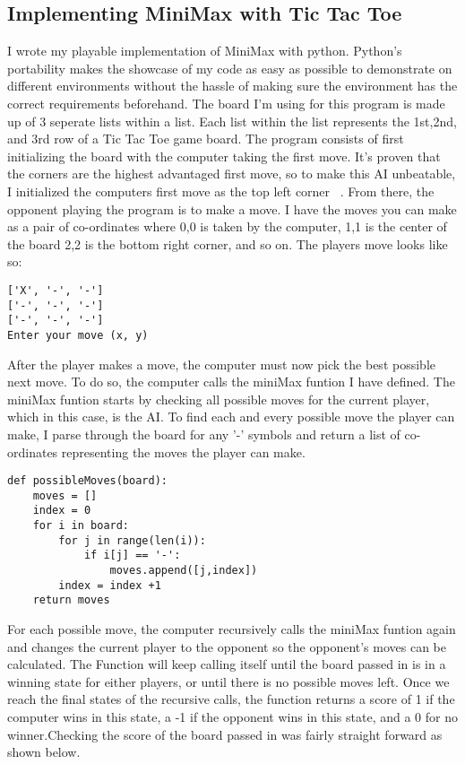 \documentclass[letterpaper]{article}
\begin{document}
\subsection{Implementing MiniMax with Tic Tac Toe}
I wrote my playable implementation of MiniMax with python. Python's portability makes the showcase of my code as easy as possible to demonstrate on different environments without the hassle of making sure the environment has the correct requirements beforehand. The board I'm using for this program is made up of 3 seperate lists within a list. Each list within the list represents the 1st,2nd, and 3rd row of a Tic Tac Toe game board. The program consists of first initializing the board with the computer taking the first move. It's proven that the corners are the highest advantaged first move, so to make this AI unbeatable, I initialized the computers first move as the top left corner ~\cite {wolframdemonstrationsproject_2007}. From there, the opponent playing the program is to make a move. I have the moves you can make as a pair of co-ordinates where 0,0 is taken by the computer, 1,1 is the center of the board 2,2 is the bottom right corner, and so on. The players move looks like so:
\begin{lstlisting}
['X', '-', '-']
['-', '-', '-']
['-', '-', '-']
Enter your move (x, y)
\end{lstlisting}
After the player makes a move, the computer must now pick the best possible next move. To do so, the computer calls the miniMax funtion I have defined. The miniMax funtion starts by checking all possible moves for the current player, which in this case, is the AI. To find each and every possible move the player can make, I parse through the board for any '-' symbols and return a list of co-ordinates representing the moves the player can make.
\begin{lstlisting}
def possibleMoves(board):
    moves = []
    index = 0
    for i in board:
        for j in range(len(i)):
            if i[j] == '-':
                moves.append([j,index])
        index = index +1
    return moves                
\end{lstlisting}
 For each possible move, the computer recursively calls the miniMax funtion again and changes the current player to the opponent so the opponent's moves can be calculated. The Function will keep calling itself until the board passed in is in a winning state for either players, or until there is no possible moves left. Once we reach the final states of the recursive calls, the function returns a score of 1 if the computer wins in this state, a -1 if the opponent wins in this state, and a 0 for no winner.Checking the score of the board passed in was fairly straight forward as shown below.
\end{document}
